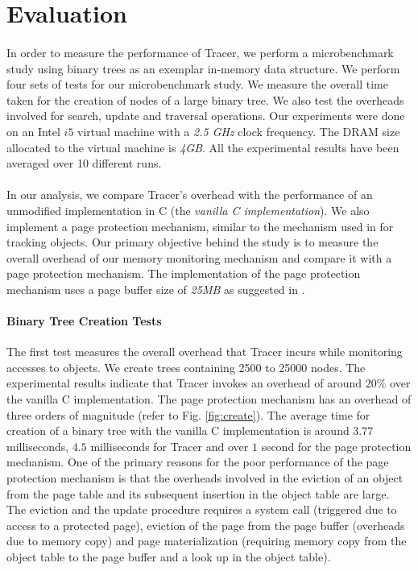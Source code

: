 \section{Evaluation}
\label{sec:eval}

\paragraph{}
In order to measure the performance of Tracer, we perform a microbenchmark study using binary trees as an exemplar in-memory data structure. We perform four sets of tests for our microbenchmark study. We measure the overall time taken for the creation of nodes of a large binary tree. We also test the overheads involved for search, update and traversal operations. Our experiments were done on an Intel $i5$ virtual machine with a {\emph{2.5 GHz}} clock frequency. The DRAM size allocated to the virtual machine is {\emph{4GB}}. All the experimental results have been averaged over 10 different runs. 

\paragraph{}
In our analysis, we compare Tracer's overhead with the performance of an unmodified implementation in C (the {\emph{vanilla C implementation}}). We also implement a page protection mechanism, similar to the mechanism used in \cite{SSDAlloc} for tracking objects. Our primary objective behind the study is to measure the overall overhead of our memory monitoring mechanism and compare it with a page protection mechanism. The implementation of the page protection mechanism uses a page buffer size of {\emph{25MB}} as suggested in \cite{SSDAlloc}.


\paragraph{Binary Tree Creation Tests}
The first test measures the overall overhead that Tracer incurs while monitoring accesses to objects. We create trees containing 2500 to 25000 nodes. The experimental results indicate that Tracer invokes an overhead of around $20\%$ over the vanilla C implementation. The page protection mechanism has an overhead of three orders of magnitude (refer to Fig. \ref{fig:create}). The average time for creation of a binary tree with the vanilla C implementation is around $3.77$ milliseconds, $4.5$ milliseconds for Tracer and over $1$ second for the page protection mechanism. One of the primary reasons for the poor performance of the page protection mechanism is that the overheads involved in the eviction of an object from the page table and its subsequent insertion in the object table are large. The eviction and the update procedure requires a system call (triggered due to access to a protected page), eviction of the page from the page buffer (overheads due to memory copy) and page materialization (requiring memory copy from the object table to the page buffer and a look up in the object table). 


